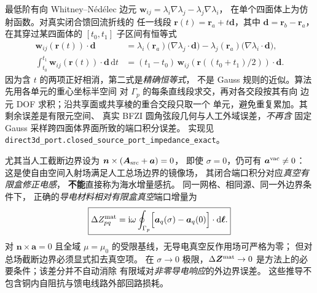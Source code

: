 最低阶有向 Whitney--N\'ed\'elec 边元
$\bm w_{ij}=\lambda_i\nabla\lambda_j-\lambda_j\nabla\lambda_i$，
在单个四面体上为仿射函数。对真实闭合馈回流折线的
任一线段 $\bm r(t)=\bm r_a+t\bm d$，其中 $\bm d=\bm r_b-\bm r_a$，
在其穿过某四面体的 $[t_0,t_1]$ 子区间有恒等式
\begin{equation}
\begin{split}
  \bm w_{ij}(\bm r(t))\cdot\bm d
   &= \lambda_i(\bm r_a)
        \bigl(\nabla\lambda_j\cdot\bm d\bigr)
     -\lambda_j(\bm r_a)
        \bigl(\nabla\lambda_i\cdot\bm d\bigr),\\
  \int_{t_0}^{t_1}
     \bm w_{ij}(\bm r(t))\cdot\bm d\,\mathrm dt
   &=(t_1-t_0)\,
        \bm w_{ij}(\bm r((t_0+t_1)/2))\cdot\bm d .
\end{split}
\end{equation}
因为含 $t$ 的两项正好相消，第二式是\emph{精确恒等式}，
不是 Gauss 规则的近似。算法先用各单元的重心坐标半空间
对 $\Gamma_p$ 的每条直线段求交，再对各交段按其有向
边元 DOF 求积；沿共享面或共享棱的重合交段只取一个
单元，避免重复累加。其剩余误差是有限元空间、
真实 BFZI 圆角弦段几何与人工外域误差，\emph{不再含}
固定 Gauss 采样跨四面体界面所致的端口积分误差。
实现见 \texttt{direct3d\_port.closed\_source\_port\_impedance\_exact}。

尤其当人工截断边界设为
$\bm n\times(\bm A_{\rm src}+\bm a)=0$，
即使 $\sigma=0$，仍可有
$\bm a^{\rm vac}\ne0$：
这是使自由空间入射场满足人工总场边界的镜像场，
其闭合端口积分对应\emph{真空有限盒修正电感}，
\textbf{不能}直接称为海水增量感抗。
同一网格、相同源、同一外边界条件下，
正确的\emph{导电材料相对有限盒真空}端口增量为
\begin{equation}
 \boxed{\Delta Z_{pq}^{\rm mat}
 =\mathrm i\omega\oint_{\Gamma_p}
  \Bigl[\bm a_q(\sigma)-\bm a_q(0)\Bigr]
        \cdot\mathrm d\bm\ell.}
\end{equation}
对 $\bm n\times\bm a=0$ 且全域 $\mu=\mu_0$
的受限基线，无导电真空反作用场可严格为零；
但对总场截断边界必须显式扣去真空项。
在 $\sigma\to0$ 极限，$\Delta\bm Z^{\rm mat}\to0$
是方法上的必要条件；该差分并不自动消除
有限域对\emph{非零导电响应}的外边界误差。
这些推导不包含铜内自阻抗与馈电线路外部回路损耗。

